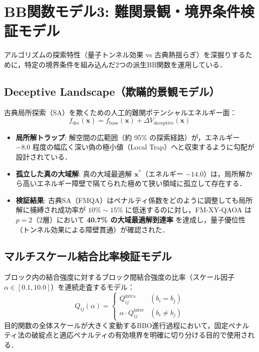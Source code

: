 \documentclass[11pt,a4paper]{ltjsarticle}
\begin{document}
\section{BB関数モデル3: 難関景観・境界条件検証モデル}
\label{sec:model_landscape}
アルゴリズムの探索特性（量子トンネル効果 vs 古典熱揺らぎ）を深掘りするために，特定の境界条件を組み込んだ2つの派生BB関数を運用している．

\subsection{Deceptive Landscape（欺瞞的景観モデル）}
古典局所探索（SA）を欺くための人工的難関ポテンシャルエネルギー面：
\begin{equation}
f_{\mathrm{dec}}(\bm{x}) = f_{\mathrm{base}}(\bm{x}) + \Delta V_{\mathrm{deceptive}}(\bm{x})
\end{equation}
\begin{itemize}\setlength{\itemsep}{2pt}
    \item \textbf{局所解トラップ}: 解空間の広範囲（約 95\% の探索経路）が，エネルギー $-8.0$ 程度の幅広く深い偽の極小値（Local Trap）へと収束するように勾配が設計されている．
    \item \textbf{孤立した真の大域解}: 真の大域最適解 $\bm{x}^*$（エネルギー $-14.0$）は，局所解から高いエネルギー障壁で隔てられた極めて狭い領域に孤立して存在する．
    \item \textbf{検証結果}: 古典SA（FMQA）はペナルティ係数をどのように調整しても局所解に捕縛され成功率が $10\% \sim 15\%$ に低迷するのに対し，FM-XY-QAOA は $p=2$（2層）において \textbf{40.7\% の大域最適解到達率} を達成し，量子優位性（トンネル効果による障壁貫通）が確認された．
\end{itemize}

\subsection{マルチスケール結合比率検証モデル}
ブロック内の結合強度に対するブロック間結合強度の比率（スケール因子 $\alpha \in [0.1, 10.0]$）を連続走査するモデル：
\begin{equation}
Q_{ij}(\alpha) = \begin{cases}
Q_{ij}^{\mathrm{intra}} & (b_i = b_j) \\
\alpha \cdot Q_{ij}^{\mathrm{inter}} & (b_i \neq b_j)
\end{cases}
\end{equation}
目的関数の全体スケールが大きく変動するBBO進行過程において，固定ペナルティ法の破綻点と適応ペナルティの有効境界を明確に切り分ける目的で使用される．
\end{document}
